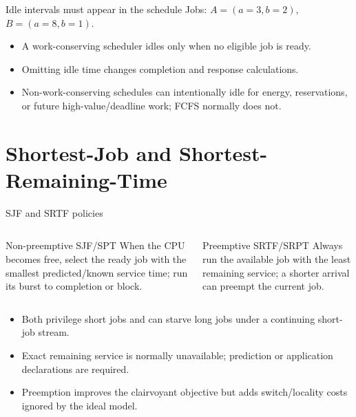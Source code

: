\documentclass[aspectratio=169,11pt]{beamer}
\begin{document}
\begin{frame}{Idle intervals must appear in the schedule}
  Jobs: $A=(a=3,b=2)$, $B=(a=8,b=1)$.
  \begin{center}
  \end{center}
  \begin{itemize}
    \item A work-conserving scheduler idles only when no eligible job is ready.
    \item Omitting idle time changes completion and response calculations.
    \item Non-work-conserving schedules can intentionally idle for energy, reservations, or future high-value/deadline work; FCFS normally does not.
  \end{itemize}
\end{frame}

\section{Shortest-Job and Shortest-Remaining-Time}

\begin{frame}{SJF and SRTF policies}
  \begin{columns}[T,onlytextwidth]
      \begin{block}{Non-preemptive SJF/SPT}
        When the CPU becomes free, select the ready job with the smallest predicted/known service time; run its burst to completion or block.
      \end{block}
      \begin{block}{Preemptive SRTF/SRPT}
        Always run the available job with the least remaining service; a shorter arrival can preempt the current job.
      \end{block}
  \end{columns}
  \begin{itemize}
    \item Both privilege short jobs and can starve long jobs under a continuing short-job stream.
    \item Exact remaining service is normally unavailable; prediction or application declarations are required.
    \item Preemption improves the clairvoyant objective but adds switch/locality costs ignored by the ideal model.
  \end{itemize}
\end{frame}
\end{document}
